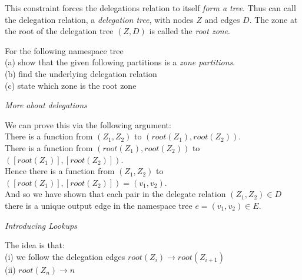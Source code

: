
This constraint forces the delegations relation to itself \textit{form a tree}. 
Thus can call the delegation relation, a \textit{delegation tree}, with nodes $Z$ and 
edges $D$. The zone at the root of the delegation tree $(Z,D)$ is called the \textit{root zone}.  


\frmrule 


\begin{example}
For the following namespace tree\\
(a) show that the given following partitions is a \textit{zone partitions}. \\
(b) find the underlying delegation relation\\
(c) state which zone is the root zone\\
\end{example}


\frmrule 

\textit{More about delegations}





We can prove this via the following argument:\\
There is a function from $(Z_1,Z_2)$ to $(root(Z_1),root(Z_2))$. \\
There is a function from $(root(Z_1),root(Z_2))$ to $([root(Z_1)],[root(Z_2)])$. \\
Hence there is a function from $(Z_1,Z_2)$ to $([root(Z_1)],[root(Z_2)]) = (v_1,v_2)$. \\
And so we have shown that each pair in the delegate relation $(Z_1,Z_2) \in D$ 
there is a unique output edge in the namespace tree $e = (v_1,v_2) \in E$. 


\frmrule 

\textit{Introducing Lookups}



The idea is that:\\
(i) we follow the delegation edges $root(Z_{i}) \rightarrow root(Z_{i+1})$ \\
(ii) $root(Z_{n}) \rightarrow n$


